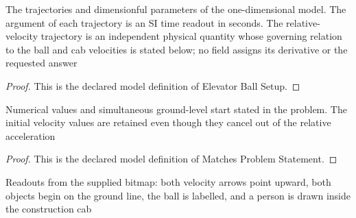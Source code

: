 \begin{definition}
  \label{def:physics:phyx-mini-0754:phyxminiproblems-problemphyxmini0754-elevatorballsetup}
  The trajectories and dimensionful parameters of the one-dimensional model. The argument of each trajectory is an SI time readout in seconds. The relative-velocity trajectory is an independent physical quantity whose governing relation to the ball and cab velocities is stated below; no field assigns its derivative or the requested answer
\end{definition}
\begin{proof}
  This is the declared model definition of Elevator Ball Setup.
\end{proof}
\begin{definition}
  \label{def:physics:phyx-mini-0754:phyxminiproblems-problemphyxmini0754-matchesproblemstatement}
  Numerical values and simultaneous ground-level start stated in the problem. The initial velocity values are retained even though they cancel out of the relative acceleration
\end{definition}
\begin{proof}
  This is the declared model definition of Matches Problem Statement.
\end{proof}
\begin{definition}
  \label{def:physics:phyx-mini-0754:phyxminiproblems-problemphyxmini0754-matchesprimaryfigure}
  Readouts from the supplied bitmap: both velocity arrows point upward, both objects begin on the ground line, the ball is labelled, and a person is drawn inside the construction cab
\end{definition}
